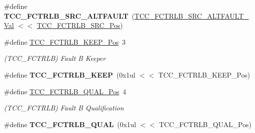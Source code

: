 \begin{DoxyCompactItemize}
\item 
\hypertarget{group___s_a_m_l21___t_c_c_ga9cc492e3ea54d2f1bbcfb4f047355f66}{}\#define {\bfseries T\+C\+C\+\_\+\+F\+C\+T\+R\+L\+B\+\_\+\+S\+R\+C\+\_\+\+A\+L\+T\+F\+A\+U\+L\+T}~(\hyperlink{group___s_a_m_l21___t_c_c_gaa224cfde9f079084ef4567c7570f5b3d}{T\+C\+C\+\_\+\+F\+C\+T\+R\+L\+B\+\_\+\+S\+R\+C\+\_\+\+A\+L\+T\+F\+A\+U\+L\+T\+\_\+\+Val}   $<$$<$ \hyperlink{group___s_a_m_l21___t_c_c_ga8cc27791b6546da73f032510287b61d5}{T\+C\+C\+\_\+\+F\+C\+T\+R\+L\+B\+\_\+\+S\+R\+C\+\_\+\+Pos})\label{group___s_a_m_l21___t_c_c_ga9cc492e3ea54d2f1bbcfb4f047355f66}

\item 
\hypertarget{group___s_a_m_l21___t_c_c_ga6be11bf2917e01c4147c9e0c696e0735}{}\#define \hyperlink{group___s_a_m_l21___t_c_c_ga6be11bf2917e01c4147c9e0c696e0735}{T\+C\+C\+\_\+\+F\+C\+T\+R\+L\+B\+\_\+\+K\+E\+E\+P\+\_\+\+Pos}~3\label{group___s_a_m_l21___t_c_c_ga6be11bf2917e01c4147c9e0c696e0735}

\begin{DoxyCompactList}\small\item\em (T\+C\+C\+\_\+\+F\+C\+T\+R\+L\+B) Fault B Keeper \end{DoxyCompactList}\item 
\hypertarget{group___s_a_m_l21___t_c_c_gad39a5ca0a732c5a1c9b963730efda51e}{}\#define {\bfseries T\+C\+C\+\_\+\+F\+C\+T\+R\+L\+B\+\_\+\+K\+E\+E\+P}~(0x1ul $<$$<$ T\+C\+C\+\_\+\+F\+C\+T\+R\+L\+B\+\_\+\+K\+E\+E\+P\+\_\+\+Pos)\label{group___s_a_m_l21___t_c_c_gad39a5ca0a732c5a1c9b963730efda51e}

\item 
\hypertarget{group___s_a_m_l21___t_c_c_ga94381fc5d6544ad0548d552720317835}{}\#define \hyperlink{group___s_a_m_l21___t_c_c_ga94381fc5d6544ad0548d552720317835}{T\+C\+C\+\_\+\+F\+C\+T\+R\+L\+B\+\_\+\+Q\+U\+A\+L\+\_\+\+Pos}~4\label{group___s_a_m_l21___t_c_c_ga94381fc5d6544ad0548d552720317835}

\begin{DoxyCompactList}\small\item\em (T\+C\+C\+\_\+\+F\+C\+T\+R\+L\+B) Fault B Qualification \end{DoxyCompactList}\item 
\hypertarget{group___s_a_m_l21___t_c_c_ga7428caaa3f7914fd8ff8066949da8542}{}\#define {\bfseries T\+C\+C\+\_\+\+F\+C\+T\+R\+L\+B\+\_\+\+Q\+U\+A\+L}~(0x1ul $<$$<$ T\+C\+C\+\_\+\+F\+C\+T\+R\+L\+B\+\_\+\+Q\+U\+A\+L\+\_\+\+Pos)\label{group___s_a_m_l21___t_c_c_ga7428caaa3f7914fd8ff8066949da8542}


\end{DoxyCompactItemize}
